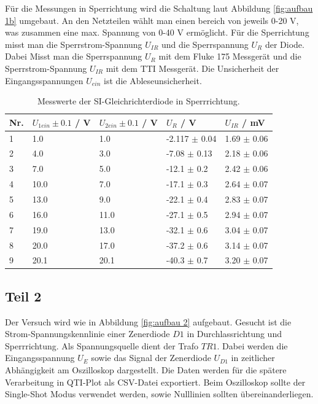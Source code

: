 \documentclass[12pt,a4paper,twoside]{article}
\begin{document}
\noindent
Für die Messungen in Sperrichtung wird die Schaltung laut Abbildung \ref{fig:aufbau 1b} umgebaut. 
An den Netzteilen wählt man einen bereich von jeweils 0-20 V, was zusammen eine max. Spannung von 0-40 V ermöglicht. 
Für die Sperrichtung misst man die Sperrstrom-Spannung $U_{IR}$ und die Sperrspannung $U_R$ der Diode. Dabei Misst man die Sperrspannung $U_R$ mit dem Fluke 175 Messgerät und die Sperrstrom-Spannung $U_{IR}$ mit dem TTI Messgerät. 
Die Unsicherheit der Eingangsspannungen $U_{ein}$ ist die Ableseunsicherheit. 

\begin{table}[H]
    \centering
    \caption{Messwerte der SI-Gleichrichterdiode in Sperrrichtung. }
    \label{tab:mess1b}
    \begin{tabular}{| l | l | l | l | l |}
        \hline
        Nr. & $U_{1ein} \pm 0.1$ / V & $U_{2ein} \pm 0.1$ / V & $U_{R}$ / V & $U_{IR}$ / mV  \\
        \hline
        1  & 1.0     & 1.0    & -2.117 $\pm$ 0.04   & 1.69 $\pm$ 0.06  \\
        2  & 4.0     & 3.0    & -7.08  $\pm$ 0.13   & 2.18 $\pm$ 0.06  \\
        3  & 7.0     & 5.0    & -12.1 $\pm$ 0.2     & 2.42 $\pm$ 0.06  \\
        4  & 10.0    & 7.0    & -17.1 $\pm$ 0.3     & 2.64 $\pm$ 0.07  \\
        5  & 13.0    & 9.0    & -22.1 $\pm$ 0.4     & 2.83 $\pm$ 0.07  \\
        6  & 16.0    & 11.0   & -27.1 $\pm$ 0.5     & 2.94 $\pm$ 0.07  \\
        7  & 19.0    & 13.0   & -32.1 $\pm$ 0.6     & 3.04 $\pm$ 0.07  \\
        8  & 20.0    & 17.0   & -37.2 $\pm$ 0.6     & 3.14 $\pm$ 0.07  \\
        9  & 20.1    & 20.1   & -40.3 $\pm$ 0.7     & 3.20 $\pm$ 0.07  \\
        \hline
    \end{tabular}
\end{table}

\subsection{Teil 2}
Der Versuch wird wie in Abbildung \ref{fig:aufbau 2} aufgebaut. 
Gesucht ist die Strom-Spannungskennlinie einer Zenerdiode $D1$ in Durchlassrichtung und Sperrrichtung. 
Als Spannungsquelle dient der Trafo $TR1$. 
Dabei werden die Eingangsspannung $U_E$ sowie das Signal der Zenerdiode $U_{D1}$ in zeitlicher Abhängigkeit am Oszilloskop dargestellt. 
Die Daten werden für die spätere Verarbeitung in QTI-Plot als CSV-Datei exportiert. 
Beim Oszilloskop sollte der Single-Shot Modus verwendet werden, sowie Nulllinien sollten übereinanderliegen. 
\end{document}
